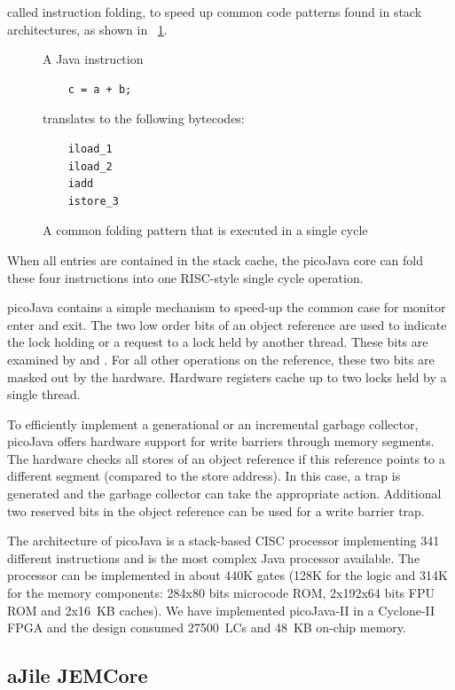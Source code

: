 called instruction folding, to speed up common code patterns found
in stack architectures, as shown in
\figurename~\ref{fig_related_folding}.
%
\begin{figure}
A Java instruction
    \begin{verbatim}
    c = a + b;
    \end{verbatim}
translates to the following bytecodes:
    \begin{verbatim}
    iload_1
    iload_2
    iadd
    istore_3
    \end{verbatim}
    \caption{A common folding pattern that is executed in a single cycle}
    \label{fig_related_folding}
\end{figure}
%
When all entries are contained in the stack cache, the picoJava core
can fold these four instructions into one RISC-style single cycle
operation.

picoJava contains a simple mechanism to speed-up the common case for
monitor enter and exit. The two low order bits of an object
reference are used to indicate the lock holding or a request to a
lock held by another thread. These bits are examined by
 and . For all other operations
on the reference, these two bits are masked out by the hardware.
Hardware registers cache up to two locks held by a single thread.

To efficiently implement a generational or an incremental garbage
collector, picoJava offers hardware support for write barriers
through memory segments. The hardware checks all stores of an object
reference if this reference points to a different segment (compared
to the store address). In this case, a trap is generated and the
garbage collector can take the appropriate action. Additional two
reserved bits in the object reference can be used for a write barrier
trap.

The architecture of picoJava is a stack-based CISC processor
implementing 341 different instructions \cite{pJ1} and is the most
complex Java processor available. The processor can be implemented
\cite{Sekar2000} in about 440K gates (128K for the logic and 314K
for the memory components: 284x80 bits microcode ROM, 2x192x64 bits
FPU ROM and 2x16~KB caches). We have implemented picoJava-II in a
Cyclone-II FPGA \cite{pjfpga} and the design consumed 27500~LCs and
48~KB on-chip memory.

\subsection{aJile JEMCore}

